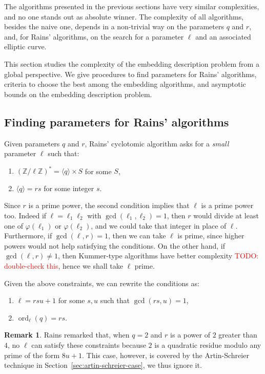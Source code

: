 \documentclass[12pt]{article}
\theoremstyle{plain}
\theoremstyle{definition}
\newtheorem*{remark}{Remark}
\newcommand{\todo}[1]{\textcolor{red}{TODO: #1}}
\DeclareMathOperator{\order}{ord} %
\def\Z{\ensuremath{\mathbb{Z}}}
\def\euler{\ensuremath{\varphi}}
\newcounter{algorithm}
\begin{document}
The algorithms presented in the previous sections have very similar
complexities, and no one stands out as absolute winner. The complexity
of all algorithms, besides the naive one, depends in a non-trivial way
on the parameters $q$ and $r$, and, for Rains' algorithms, on the
search for a parameter $\ell$ and an associated elliptic curve.

This section studies the complexity of the embedding description
problem from a global perspective. We give procedures to find
parameters for Rains' algorithms, criteria to choose the best among
the embedding algorithms, and asymptotic bounds on the embedding
description problem.


\subsection{Finding parameters for Rains' algorithms}

Given parameters $q$ and $r$, Rains' cyclotomic algorithm asks for a
\emph{small} parameter $\ell$ such that:
\begin{enumerate}
\item $(\Z/\ell\Z)^\ast = \langle q\rangle \times S$ for some $S$,
\item $\langle q \rangle = rs$ for some integer $s$.
\end{enumerate}

Since $r$ is a prime power, the second condition implies that $\ell$
is a prime power too. Indeed if $\ell=\ell_1\ell_2$ with
$\gcd(\ell_1,\ell_2)=1$, then $r$ would divide at least one of
$\euler(\ell_1)$ or $\euler(\ell_2)$, and we could take that integer
in place of $\ell$. Furthermore, if $\gcd(\ell,r)=1$, then we can take
$\ell$ is prime, since higher powers would not help satisfying the
conditions. On the other hand, if $\gcd(\ell,r)\ne1$, then Kummer-type
algorithms have better complexity \todo{double-check this}, hence we
shall take $\ell$ prime.

Given the above constraints, we can rewrite the conditions as:
\begin{enumerate}
\item $\ell = rsu + 1$ for some $s,u$ such that $\gcd(rs,u)=1$,
\item $\order_\ell(q) = rs$.
\end{enumerate}

\begin{remark}
  Rains remarked that, when $q=2$ and $r$ is a power of $2$ greater
  than $4$, no $\ell$ can satisfy these constraints because $2$ is a
  quadratic residue modulo any prime of the form $8u+1$. This case,
  however, is covered by the Artin-Schreier technique in
  Section~\ref{sec:artin-schreier-case}, we thus ignore it.
\end{remark}
\end{document}
